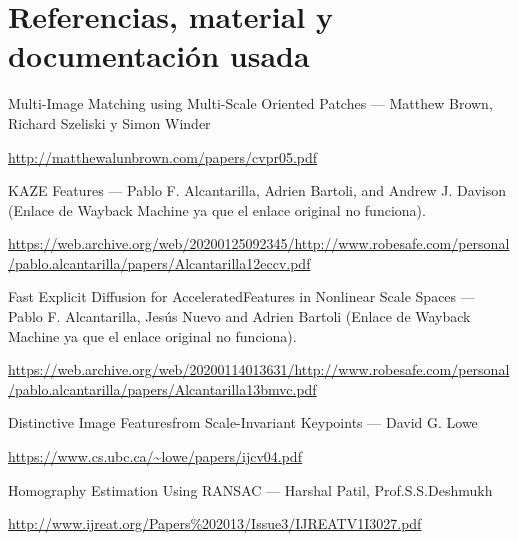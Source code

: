 \documentclass[12pt, spanish]{article}
\begin{document}
\newpage

\section{Referencias, material y documentación usada}


\begin{thebibliography}{9}


		Multi-Image Matching using Multi-Scale Oriented Patches --- Matthew Brown, Richard Szeliski y Simon Winder

		\url{http://matthewalunbrown.com/papers/cvpr05.pdf}


		KAZE Features --- Pablo F. Alcantarilla, Adrien Bartoli, and Andrew J. Davison (Enlace de Wayback Machine ya que el enlace original no funciona).

		\url{https://web.archive.org/web/20200125092345/http://www.robesafe.com/personal/pablo.alcantarilla/papers/Alcantarilla12eccv.pdf}


		Fast Explicit Diffusion for AcceleratedFeatures in Nonlinear Scale Spaces --- Pablo F. Alcantarilla, Jesús Nuevo and Adrien Bartoli (Enlace de Wayback Machine ya que el enlace original no funciona).

		\url{https://web.archive.org/web/20200114013631/http://www.robesafe.com/personal/pablo.alcantarilla/papers/Alcantarilla13bmvc.pdf}



		Distinctive Image Featuresfrom Scale-Invariant Keypoints --- David G. Lowe

		\url{https://www.cs.ubc.ca/~lowe/papers/ijcv04.pdf}


		Homography Estimation Using RANSAC --- Harshal Patil, Prof.S.S.Deshmukh

		\url{http://www.ijreat.org/Papers\%202013/Issue3/IJREATV1I3027.pdf}

\end{thebibliography}
\end{document}
